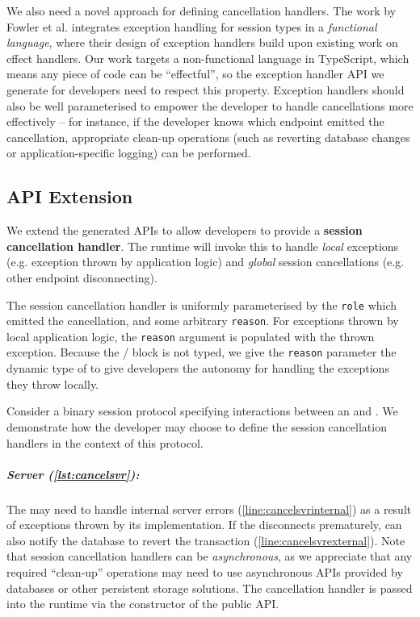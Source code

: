 We also need a novel approach for defining cancellation handlers.
The work by Fowler et al. \cite{Exceptional} integrates 
exception handling for session types in a 
\textit{functional language}, where their design of
exception handlers build upon existing work on effect handlers.
Our work targets a non-functional language in TypeScript,
which means any piece of code can be ``effectful'',
so the exception handler API we generate for developers
need to respect this property.
Exception handlers should also be well parameterised
to empower the developer to handle cancellations more effectively
-- for instance, if the developer knows which endpoint
emitted the cancellation, appropriate clean-up operations
(such as reverting database changes or application-specific
logging) can be performed.

\subsection{API Extension}
\label{subsection:errorapi}

We extend the generated APIs to
allow developers to provide a \textbf{session cancellation
handler}. The runtime will invoke this
to handle \textit{local} exceptions (e.g. exception
thrown by application logic) and \textit{global} session
cancellations (e.g. other endpoint disconnecting).

The session cancellation handler is uniformly
parameterised by the \texttt{role} which emitted the cancellation,
and some arbitrary \texttt{reason}. For exceptions thrown
by local application logic, the \texttt{reason} argument
is populated with the thrown exception. Because the 
 /  block is not typed,
we give the \texttt{reason} parameter the dynamic type of
 to give developers the autonomy for 
handling the exceptions they throw locally.

Consider a binary session protocol specifying interactions
between an  and .
We demonstrate how the developer may choose to define
the session cancellation handlers in the context of this protocol.

\subparagraph{Server (\cref{lst:cancelsvr}):}
The 
may need to handle internal server errors 
(\cref{line:cancelsvrinternal}) as a result of
exceptions thrown by its implementation. 
If the  disconnects prematurely, 
 can also notify the database 
to revert the transaction (\cref{line:cancelsvrexternal}). 
Note that session cancellation handlers can be 
\textit{asynchronous}, as we appreciate that any required
``clean-up'' operations may need to use asynchronous APIs
provided by databases or other persistent storage solutions.
The cancellation handler is passed into the runtime via
the constructor of the public API.

